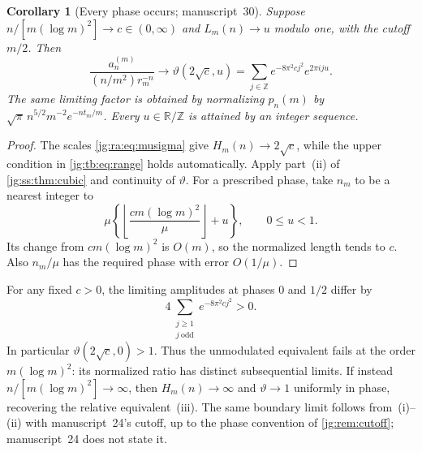 \documentclass[11pt,a4paper]{article}
\newtheorem{corollary}[corollary]{Corollary}
\theoremstyle{definition}\newaliascnt{definition}{theorem}
\theoremstyle{remark}\newaliascnt{remark}{theorem}
\newcommand{\R}{\mathbb R}
\begin{document}
\begin{corollary}[Every phase occurs; manuscript~30]\label{jg:tb:cor:boundary}
Suppose $n/[m(\log m)^2]\to c\in(0,\infty)$ and $L_m(n)\to u$ modulo one, with
the cutoff $m/2$. Then
\begin{equation}\label{jg:tb:eq:limit}
 \frac{a_n^{(m)}}{(n/m^2)r_m^{-n}}
 \longrightarrow
 \vartheta(2\sqrt c,u)
 =\sum_{j\in\mathbb Z}e^{-8\pi^2cj^2}e^{2\pi iju}.
\end{equation}
The same limiting factor is obtained by normalizing $p_n(m)$ by
$\sqrt\pi\,n^{5/2}m^{-2}e^{-nt_m/m}$. Every $u\in\R/\mathbb Z$ is attained by an
integer sequence.
\end{corollary}
\begin{proof}
The scales \eqref{jg:ra:eq:musigma} give $H_m(n)\to2\sqrt c$, while the upper
condition in \eqref{jg:tb:eq:range} holds automatically. Apply part~(ii) of
\cref{jg:ss:thm:cubic} and continuity of $\vartheta$. For a prescribed phase,
take $n_m$ to be a nearest integer to
\[
 \mu\left\{
     \left\lfloor\frac{c m(\log m)^2}{\mu}\right\rfloor+u
       \right\},\qquad 0\le u<1.
\]
Its change from $c m(\log m)^2$ is $O(m)$, so the normalized length tends to
$c$. Also $n_m/\mu$ has the required phase with error $O(1/\mu)$.
\end{proof}

For any fixed $c>0$, the limiting amplitudes at phases $0$ and $1/2$ differ by
\begin{equation}\label{jg:tb:eq:difference}
 4\sum_{\substack{j\ge1\\j\ \mathrm{odd}}}e^{-8\pi^2cj^2}>0.
\end{equation}
In particular $\vartheta(2\sqrt c,0)>1$. Thus the unmodulated equivalent fails
at the order $m(\log m)^2$: its normalized ratio has distinct subsequential
limits. If instead $n/[m(\log m)^2]\to\infty$, then $H_m(n)\to\infty$ and
$\vartheta\to1$ uniformly in phase, recovering the relative equivalent~(iii).
The same boundary limit follows from~(i)--(ii) with manuscript~24's cutoff, up
to the phase convention of \cref{jg:rem:cutoff}; manuscript~24 does not state
it.
\end{document}
